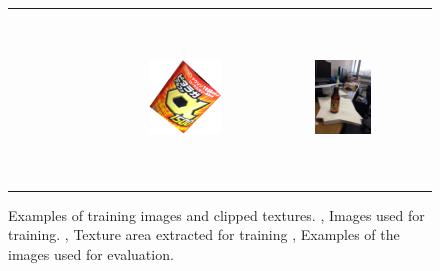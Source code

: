 \begin{figure}[t]
\begin{tabular}{l| c| c| c }
{\begin{subfigure}[b]{.25\linewidth}
\caption{}
\label{s4}
		 \end{subfigure} }
&{
\begin{subfigure}[b]{.25\linewidth}
	   \includegraphics[height=1.5in]{images/ttext1.png}

\caption{}
\label{s5}
	 	 \end{subfigure}}
&{
\begin{subfigure}[b]{.25\linewidth}
	   \includegraphics[height=1.5in]{images/test2.jpg}

\caption{}
\label{s6}
	  \end{subfigure}}

\end{tabular}
    \caption{Examples of training images and clipped textures. \protect{} , \protect{} Images used for training. \protect {}, \protect {}  Texture area extracted for training \protect {}, \protect {} Examples of the images used for evaluation.  
}
    \label{Samples1}
\end{figure}
